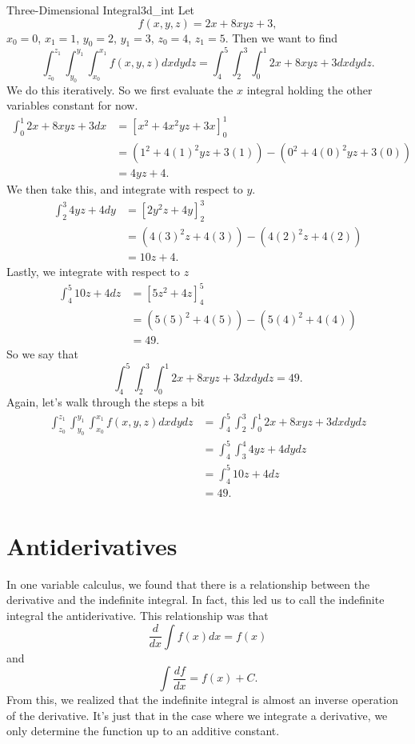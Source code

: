         \begin{ex}{Three-Dimensional Integral}{3d_int}
        Let
        \[
        f(x,y,z)=2x + 8xyz + 3,
        \]
        $x_0 = 0$, $x_1=1$, $y_0=2$, $y_1=3$, $z_0 =4$, $z_1=5$.  Then we want to find
        \[
        \int_{z_0}^{z_1}\int_{y_0}^{y_1}\int_{x_0}^{x_1} f(x,y,z)dxdydz = \int_4^5 \int_2^3 \int_0^1 2x+8xyz+3dxdydz.
        \]
        We do this iteratively.  So we first evaluate the $x$ integral holding the other variables constant for now.
        \begin{align*}
            \int_0^1 2x+8xyz+3 dx &= \left[ x^2 + 4x^2yz+3x\right]_0^1\\
            &= \left( 1^2 + 4(1)^2yz+3(1)\right) - \left( 0^2+4(0)^2yz+3(0)\right)\\
            &= 4yz+4.
        \end{align*}
        We then take this, and integrate with respect to $y$.
        \begin{align*}
            \int_2^3 4yz + 4 dy &= \left[ 2y^2z+4y\right]_2^3\\
            &= (4(3)^2z+4(3))-(4(2)^2z+4(2))\\
            &= 10z+4.
        \end{align*}
        Lastly, we integrate with respect to $z$
        \begin{align*}
            \int_4^5 10z+4 dz &= \left[ 5z^2+4z\right]_4^5\\
            &= (5(5)^2+4(5))-(5(4)^2+4(4))\\
            &=49.
        \end{align*}
        So we say that
        \[
        \int_4^5 \int_2^3 \int_0^1 2x+8xyz+3dxdydz = 49.
        \]
        Again, let's walk through the steps a bit
        \begin{align*}
            \int_{z_0}^{z_1}\int_{y_0}^{y_1}\int_{x_0}^{x_1} f(x,y,z)dxdydz &= \int_4^5 \int_2^3 \int_0^1 2x+8xyz+3dxdydz\\
            &= \int_4^5 \int_3^4 4yz+4dydz\\
            &= \int_4^5 10z+4dz\\
            &= 49.
        \end{align*}
        \end{ex}
        
        \section{Antiderivatives}
        In one variable calculus, we found that there is a relationship between the derivative and the indefinite integral.  In fact, this led us to call the indefinite integral the antiderivative.  This relationship was that
        \[
        \frac{d}{dx}\int f(x)dx = f(x)
        \]
        and
        \[
        \int \frac{df}{dx} = f(x) + C.
        \]
        From this, we realized that the indefinite integral is almost an inverse operation of the derivative.  It's just that in the case where we integrate a derivative, we only determine the function up to an additive constant. 
        
